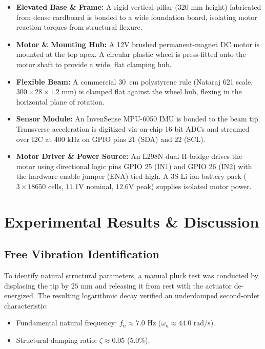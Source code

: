 \documentclass[conference]{IEEEtran}
\begin{document}
\begin{itemize}
    \item \textbf{Elevated Base \& Frame:} A rigid vertical pillar ($320\text{ mm}$ height) fabricated from dense cardboard is bonded to a wide foundation board, isolating motor reaction torques from structural flexure.
    \item \textbf{Motor \& Mounting Hub:} A 12V brushed permanent-magnet DC motor is mounted at the top apex. A circular plastic wheel is press-fitted onto the motor shaft to provide a wide, flat clamping hub.
    \item \textbf{Flexible Beam:} A commercial 30~cm polystyrene rule (Nataraj 621 scale, $300 \times 28 \times 1.2\text{ mm}$) is clamped flat against the wheel hub, flexing in the horizontal plane of rotation.
    \item \textbf{Sensor Module:} An InvenSense MPU-6050 IMU is bonded to the beam tip. Transverse acceleration is digitized via on-chip 16-bit ADCs and streamed over I2C at $400\text{ kHz}$ on GPIO pins 21 (SDA) and 22 (SCL).
    \item \textbf{Motor Driver \& Power Source:} An L298N dual H-bridge drives the motor using directional logic pins GPIO 25 (IN1) and GPIO 26 (IN2) with the hardware enable jumper (ENA) tied high. A 3S Li-ion battery pack ($3 \times 18650$ cells, $11.1\text{V}$ nominal, $12.6\text{V}$ peak) supplies isolated motor power.
\end{itemize}

\section{Experimental Results \& Discussion}

\subsection{Free Vibration Identification}
To identify natural structural parameters, a manual pluck test was conducted by displacing the tip by $25\text{ mm}$ and releasing it from rest with the actuator de-energized. The resulting logarithmic decay verified an underdamped second-order characteristic:
\begin{itemize}
    \item Fundamental natural frequency: $f_n \approx 7.0\text{ Hz}$ ($\omega_n \approx 44.0\text{ rad/s}$).
    \item Structural damping ratio: $\zeta \approx 0.05$ ($5.0\%$).
\end{itemize}
\end{document}
